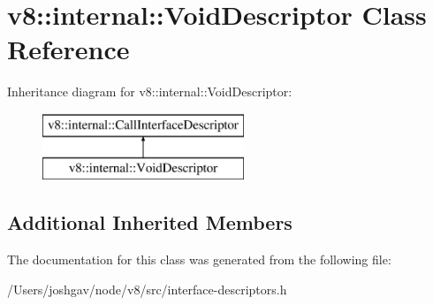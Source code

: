 \hypertarget{classv8_1_1internal_1_1_void_descriptor}{}\section{v8\+:\+:internal\+:\+:Void\+Descriptor Class Reference}
\label{classv8_1_1internal_1_1_void_descriptor}
Inheritance diagram for v8\+:\+:internal\+:\+:Void\+Descriptor\+:\begin{figure}[H]
\begin{center}
\leavevmode
\includegraphics[height=2.000000cm]{classv8_1_1internal_1_1_void_descriptor}
\end{center}
\end{figure}
\subsection*{Additional Inherited Members}


The documentation for this class was generated from the following file\+:\begin{DoxyCompactItemize}
\item 
/\+Users/joshgav/node/v8/src/interface-\/descriptors.\+h\end{DoxyCompactItemize}
